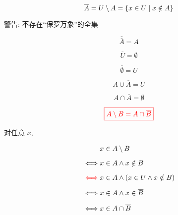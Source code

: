 \begin{frame}{}
  \begin{definition}
    \[
      \overline{A} = U \setminus A = \{x \in U \mid x \notin A\}
    \]
  \end{definition}

  \pause
  \vspace{0.30cm}
  \begin{center}

    \pause
    \vspace{0.80cm}
    警告: 不存在``保罗万象''的全集
  \end{center}
\end{frame}

\begin{frame}{}
  \begin{center}
  \end{center}

  \[
    \overline{\overline{A}} = A
  \]

  \[
    \overline{U} = \emptyset
  \]

  \[
    \overline{\emptyset} = U
  \]

  \[
    A \cup \overline{A} = U
  \]

  \[
    A \cap \overline{A} = \emptyset
  \]
\end{frame}

\begin{frame}{}
  \begin{theorem}
    \[
      \textcolor{red}{\boxed{A \setminus B = A \cap \overline{B}}}
    \]
  \end{theorem}

  \pause
  \vspace{0.30cm}
  \begin{center}
    对任意 $x$,
  \end{center}
  \setcounter{equation}{0}
  \begin{align}
    &x \in A \setminus B \\[6pt]
    \iff & x \in A \land x \notin B \\[6pt]
    \textcolor{red}{\iff} & x \in A \land (x \in U \land x \notin B) \\[6pt]
    \iff & x \in A \land x \in \overline{B} \\[6pt]
    \iff & x \in A \cap \overline{B}
  \end{align}
\end{frame}


